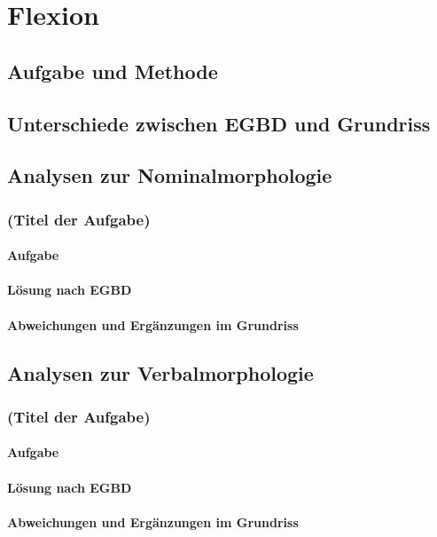 \chapter{Flexion}
\label{sec:flexion}

\section{Aufgabe und Methode}
\label{sec:flexion:aufgabeundmethoden}

\section{Unterschiede zwischen EGBD und Grundriss}
\label{sec:flexion:unterschiedezwischenegbdundgrundriss}

\section{Analysen zur Nominalmorphologie}
\label{sec:flexion:analysenzurnominalmorphologie}

\subsection{(Titel der Aufgabe)}

\subsubsection{Aufgabe}

\subsubsection{Lösung nach EGBD}

\subsubsection{Abweichungen und Ergänzungen im Grundriss}


\section{Analysen zur Verbalmorphologie}
\label{sec:flexion:analysenzurverbalmorphologie}

\subsection{(Titel der Aufgabe)}

\subsubsection{Aufgabe}

\subsubsection{Lösung nach EGBD}

\subsubsection{Abweichungen und Ergänzungen im Grundriss}
